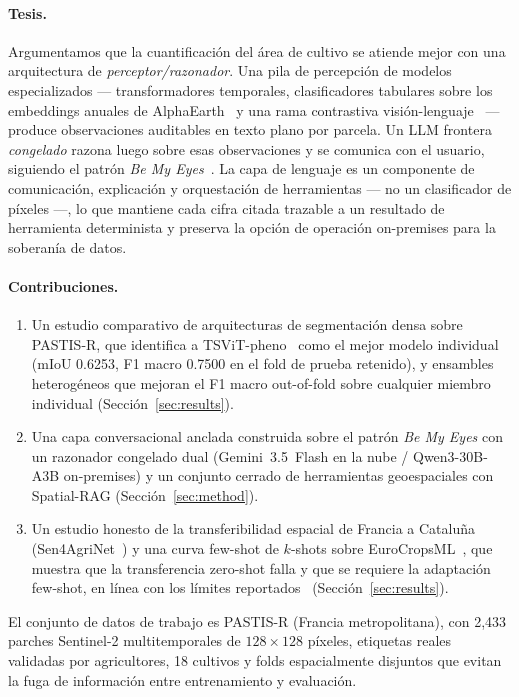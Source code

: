 \paragraph{Tesis.}
Argumentamos que la cuantificación del área de cultivo se atiende mejor
con una arquitectura de \emph{perceptor/razonador}. Una pila de
percepción de modelos especializados --- transformadores temporales,
clasificadores tabulares sobre los embeddings anuales de
AlphaEarth~\cite{brown2025alphaearth} y una rama contrastiva
visión-lenguaje~\cite{li2025farslip} --- produce observaciones
auditables en texto plano por parcela. Un LLM frontera \emph{congelado}
razona luego sobre esas observaciones y se comunica con el usuario,
siguiendo el patrón \emph{Be My
Eyes}~\cite{huang2025bemyeyes}. La capa de lenguaje es un componente de
comunicación, explicación y orquestación de herramientas --- no un
clasificador de píxeles ---, lo que mantiene cada cifra citada trazable
a un resultado de herramienta determinista y preserva la opción de
operación on-premises para la soberanía de datos.

\paragraph{Contribuciones.}
\begin{enumerate}[leftmargin=*]
    \item Un estudio comparativo de arquitecturas de segmentación densa
    sobre PASTIS-R, que identifica a
    TSViT-pheno~\cite{tarasiou2023tsvit} como el mejor modelo individual
    (mIoU 0.6253, F1 macro 0.7500 en el fold de prueba retenido), y
    ensambles heterogéneos que mejoran el F1 macro out-of-fold sobre
    cualquier miembro individual
    (Sección~\ref{sec:results}).
    \item Una capa conversacional anclada construida sobre el patrón
    \emph{Be My Eyes} con un razonador congelado dual (Gemini~3.5~Flash en
    la nube / Qwen3-30B-A3B on-premises) y un conjunto cerrado de
    herramientas geoespaciales con Spatial-RAG
    (Sección~\ref{sec:method}).
    \item Un estudio honesto de la transferibilidad espacial de Francia a
    Cataluña (Sen4AgriNet~\cite{sykas2022sen4agrinet}) y una curva
    few-shot de $k$-shots sobre
    EuroCropsML~\cite{reuss2025eurocropsml}, que muestra que la
    transferencia zero-shot falla y que se requiere la adaptación
    few-shot, en línea con los límites
    reportados~\cite{harvesting2026alphaearth}
    (Sección~\ref{sec:results}).
\end{enumerate}

El conjunto de datos de trabajo es PASTIS-R (Francia metropolitana), con
2{,}433 parches Sentinel-2 multitemporales de $128\times128$ píxeles,
etiquetas reales validadas por agricultores, 18 cultivos y folds
espacialmente disjuntos que evitan la fuga de información entre
entrenamiento y evaluación.
